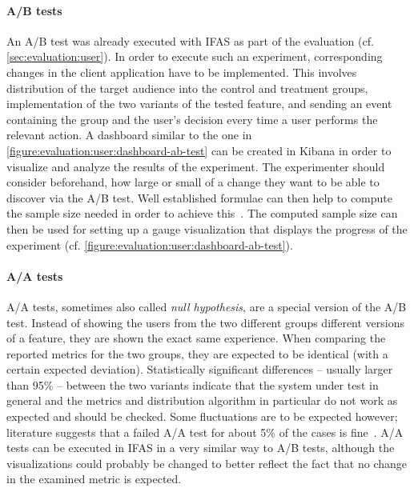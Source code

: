 \paragraph{A/B tests}
An A/B test was already executed with \ac{IFAS} as part of the evaluation (cf. \cref{sec:evaluation:user}).
In order to execute such an experiment, corresponding changes in the client application have to be implemented.
This involves distribution of the target audience into the control and treatment groups, implementation of the two variants of the tested feature, and sending an event containing the group and the user's decision every time a user performs the relevant action.
A dashboard similar to the one in \cref{figure:evaluation:user:dashboard-ab-test} can be created in Kibana in order to visualize and analyze the results of the experiment.
The experimenter should consider beforehand, how large or small of a change they want to be able to discover via the A/B test.
Well established formulae can then help to compute the sample size needed in order to achieve this~\cite{Kohavi2009,box2005statistics}.
The computed sample size can then be used for setting up a gauge visualization that displays the progress of the experiment (cf. \cref{figure:evaluation:user:dashboard-ab-test}).

\paragraph{A/A tests}
A/A tests, sometimes also called \emph{null hypothesis}, are a special version of the A/B test.
Instead of showing the users from the two different groups different versions of a feature, they are shown the exact same experience.
When comparing the reported metrics for the two groups, they are expected to be identical (with a certain expected deviation).
Statistically significant differences -- usually larger than 95\% -- between the two variants indicate that the system under test in general and the metrics and distribution algorithm in particular do not work as expected and should be checked.
Some fluctuations are to be expected however; literature suggests that a failed A/A test for about 5\% of the cases is fine~\cite{Kohavi2009}.
A/A tests can be executed in \ac{IFAS} in a very similar way to A/B tests, although the visualizations could probably be changed to better reflect the fact that no change in the examined metric is expected.

